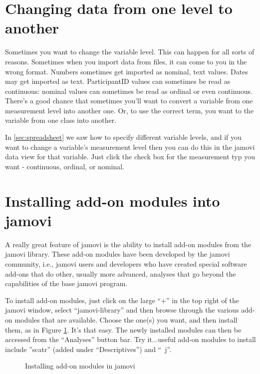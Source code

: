 \section{Changing data from one level to another\label{sec:coercion}}

Sometimes you want to change the variable level. This can happen for all sorts of reasons. Sometimes when you import data from files, it can come to you in the wrong format. Numbers sometimes get imported as nominal, text values. Dates may get imported as text. ParticipantID values can sometimes be read as continuous: nominal values can sometimes be read as ordinal or even continuous. There's a good chance that sometimes you'll want to convert a variable from one measurement level into another one. Or, to use the correct term, you want to  the variable from one class into another. 

In \ref{sec:spreadsheet} we saw how to specify different variable levels, and if you want to change a variable's measurement level then you can do this in the jamovi data view for that variable. Just click the check box for the measurement typ you want - continuous, ordinal, or nominal. 


\section{Installing add-on modules into jamovi \label{sec:jamovimodules}}

A really great feature of jamovi is the ability to install add-on modules from the jamovi library. These add-on modules have been developed by the jamovi community, i.e., jamovi users and developers who have created special software add-ons that do other, usually more advanced, analyses that go beyond the capabilities of the base jamovi program. 

To install add-on modules, just click on the large \large{``+''} in the top right of the jamovi window, select ``jamovi-library'' and then browse through the various add-on modules that are available. Choose the one(s) you want, and then install them, as in Figure \ref{fig:modules}. It's that easy. The newly installed modules can then be accessed from the ``Analyses'' button bar. Try it...useful add-on modules to install include ''scatr'' (added under ``Descriptives'') and ``\R\ j''. 

\begin{figure}[htb]
\begin{center}
\caption{Installing add-on modules in jamovi}
\label{fig:modules}
\HR
\end{center}
\end{figure}


